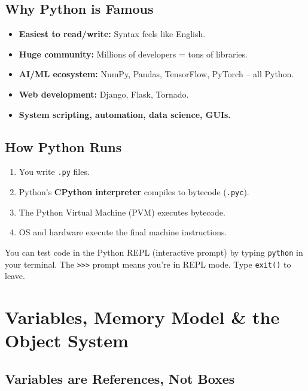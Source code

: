 \documentclass[12pt,a4paper]{article}
\newcommand{\code}[1]{\texttt{\small\color{pyblue}#1}}
\begin{document}
\subsection{Why Python is Famous}

\begin{itemize}
  \item \textbf{Easiest to read/write:} Syntax feels like English.
  \item \textbf{Huge community:} Millions of developers = tons of libraries.
  \item \textbf{AI/ML ecosystem:} NumPy, Pandas, TensorFlow, PyTorch -- all Python.
  \item \textbf{Web development:} Django, Flask, Tornado.
  \item \textbf{System scripting, automation, data science, GUIs.}
\end{itemize}

\subsection{How Python Runs}

\begin{enumerate}
  \item You write \code{.py} files.
  \item Python's \textbf{CPython interpreter} compiles to bytecode (\code{.pyc}).
  \item The Python Virtual Machine (PVM) executes bytecode.
  \item OS and hardware execute the final machine instructions.
\end{enumerate}

\begin{tipbox}
You can test code in the Python REPL (interactive prompt) by typing \code{python} in your terminal. The \texttt{>>>} prompt means you're in REPL mode. Type \code{exit()} to leave.
\end{tipbox}

\section{Variables, Memory Model \& the Object System}

\subsection{Variables are References, Not Boxes}
\end{document}
